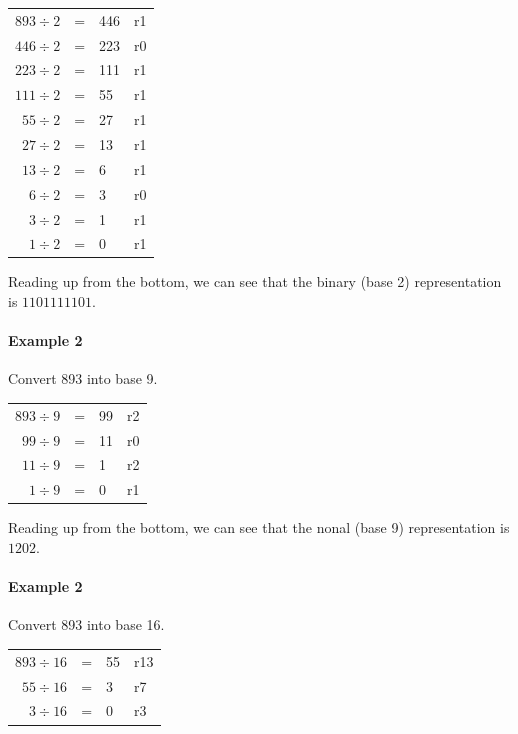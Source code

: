 \begin{center}
	\begin{tabular} {r l l l }
		$893 \div 2$ & = & 446 & r1\\
		$446 \div 2$ & = & 223 & r0\\
		$223 \div 2$ & = & 111 & r1\\
		$111 \div 2$ & = & 55 & r1\\
		$55 \div 2$ & = & 27 & r1\\
		$27 \div 2$ & = & 13 & r1\\
		$13 \div 2$ & = & 6 & r1\\
		$6 \div 2$ & = & 3 & r0\\
		$3 \div 2$ & = & 1 & r1\\
		$1 \div 2$ & = & 0 & r1\\
	\end{tabular}
\end{center}

Reading up from the bottom, we can see that the binary (base 2) representation
is $1101111101$.

\paragraph{Example 2}
Convert 893 into base 9.

\begin{center}
	\begin{tabular} {r l l l }
		$893 \div 9$ & = & 99 & r2\\
		$99 \div 9$ & = & 11 & r0\\
		$11 \div 9$ & = & 1 & r2\\
		$1 \div 9$ & = & 0 & r1\\
	\end{tabular}
\end{center}

Reading up from the bottom, we can see that the nonal (base 9) representation is
$1202$.

\paragraph{Example 2}
Convert 893 into base 16.

\begin{center}
	\begin{tabular} {r l l l }
		$893 \div 16$ & = & 55 & r13\\
		$55 \div 16$ & = & 3 & r7\\
		$3 \div 16$ & = & 0 & r3\\
	\end{tabular}
\end{center}

